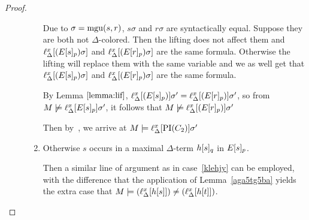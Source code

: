 \documentclass[,%
	paper=a4,%
	DIV14, 
	liststotoc,
	bibtotoc,
	draft=false,%
	numbers=noendperiod
]{scrartcl}
\newcommand{\lif}[1]{\lift{\Delta}{#1}{x}}
\begin{document}
\begin{proof}
\begin{description}
\begin{enumerate}
				Due to $\sigma=\operatorname{mgu}(s, r)$, $s\sigma$ and $r\sigma$ are syntactically equal.
				Suppose they are both not $\Delta$-colored.
				Then the lifting does not affect them and 
				$\lif{(E\occurat{s}{p})\sigma}$ and $\lif{(E\occurat{r}{p})\sigma}$ are the same formula.
				Otherwise the lifting will replace them with the same variable and we as well get that
				$\lif{(E\occurat{s}{p})\sigma}$ and $\lif{(E\occurat{r}{p})\sigma}$ are the same formula.

				By Lemma $\ref{lemma:lif}$, 
				$\lif{(E\occurat{s}{p})}\sigma' = \lif{(E\occurat{r}{p})}\sigma'$,
				so from $M \notentails \lif{E\occurat{s}{p}}\sigma'$, it follows that $M \notentails \lif{(E\occurat{r}{p})}\sigma'$

				Then by~\markB{}, we arrive at $M\entails \lif{\PI(C_2)}\sigma'$






			\item Otherwise $s$ occurs in a maximal $\Delta$-term $h{[s]_{q}}$ in $E{[s]_{p}}$.

				Then a similar line of argument as in case~\ref{klehjy} can be employed, with the difference that the application of Lemma~\ref{aga5tg5ba} yields the extra case that 
			$M\entails (\lif{h\occur{s}}) \neq (\lif{h\occur{t}})$.
				\begin{comment}
				\newenvironment{lemmaCustomNo}[1]
				{\renewcommand{\thelemma}{\ref{#1}$'$}%
					\addtocounter{lemma}{-1}%
				\begin{lemma}}
				{\end{lemma}}


				Then we have to replace Lemma \ref{aga5tg5ba} by:
				\bigskip

				\begin{lemmaCustomNo}{aga5tg5ba}
					$M \entails (\lif{s}) = (\lif{t})$ and $M\notentails \lif{E\occurat{t}{p}}\sigma'$ imply that $M\notentails \lif{E\occurat{s}{p}}\sigma'$ or that $\lif{h\occurat{s}{q}} \neq \lif{h\occurat{t}{q}}$.
				\end{lemmaCustomNo}
				\begin{proof}
					If $\lif{E\occurat{t}{p}}$ and $\lif{E\occurat{s}{p}}$ differ only at position $p$, then the proof of Lemma \ref{aga5tg5ba} applies.
					

\end{comment}
\end{enumerate}
\end{description}
\end{proof}
\end{document}
